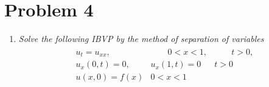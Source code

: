 \documentclass[paper=a4, fontsize=11pt]{scrartcl} %
\theoremstyle{plain}
\numberwithin{equation}{section} %
\numberwithin{figure}{section} %
\numberwithin{table}{section} %
\begin{document}
\section{Problem 4}
\begin{enumerate}[\bf (a)]
    \item
        \emph{Solve the following IBVP by the method of separation of variables}
        \begin{align*}
            \begin{array}{rrr}
                u_t = u_{xx}, & \qquad 0 < x < 1, & \qquad t > 0, \\
                u_x(0, t) = 0, & u_x(1, t) = 0 & t > 0 \\
                u(x, 0) = f(x) & 0 < x < 1
            \end{array}
        \end{align*}


\end{enumerate}
\end{document}
